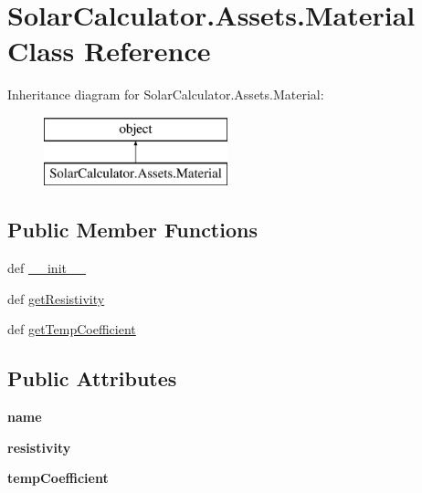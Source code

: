 \hypertarget{class_solar_calculator_1_1_assets_1_1_material}{\section{Solar\-Calculator.\-Assets.\-Material Class Reference}
\label{class_solar_calculator_1_1_assets_1_1_material}
}
Inheritance diagram for Solar\-Calculator.\-Assets.\-Material\-:\begin{figure}[H]
\begin{center}
\leavevmode
\includegraphics[height=2.000000cm]{class_solar_calculator_1_1_assets_1_1_material}
\end{center}
\end{figure}
\subsection*{Public Member Functions}
\begin{DoxyCompactItemize}
\item 
def \hyperlink{class_solar_calculator_1_1_assets_1_1_material_adc9c0ebecc5542b5838254e9a6bacd27}{\-\_\-\-\_\-init\-\_\-\-\_\-}
\item 
def \hyperlink{class_solar_calculator_1_1_assets_1_1_material_ac8e5216c725ba5a14c42a128ad85436d}{get\-Resistivity}
\item 
def \hyperlink{class_solar_calculator_1_1_assets_1_1_material_a84c8b8d2c74c49a510119ed4f75c16b0}{get\-Temp\-Coefficient}
\end{DoxyCompactItemize}
\subsection*{Public Attributes}
\begin{DoxyCompactItemize}
\item 
\hypertarget{class_solar_calculator_1_1_assets_1_1_material_aa2e486a2405bb6c909f56daf6ec95791}{{\bfseries name}}\label{class_solar_calculator_1_1_assets_1_1_material_aa2e486a2405bb6c909f56daf6ec95791}

\item 
\hypertarget{class_solar_calculator_1_1_assets_1_1_material_a3542b5d39132516c692d23d5d543f5dc}{{\bfseries resistivity}}\label{class_solar_calculator_1_1_assets_1_1_material_a3542b5d39132516c692d23d5d543f5dc}

\item 
\hypertarget{class_solar_calculator_1_1_assets_1_1_material_ab37e7cecfb4ef6bfb5bd0ac48b9caa99}{{\bfseries temp\-Coefficient}}\label{class_solar_calculator_1_1_assets_1_1_material_ab37e7cecfb4ef6bfb5bd0ac48b9caa99}

\end{DoxyCompactItemize}


